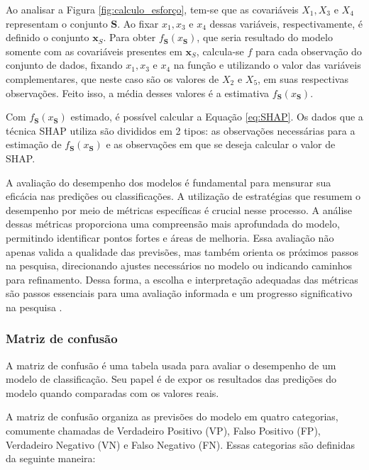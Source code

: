 Ao analisar a Figura \ref{fig:calculo_esforço}, tem-se que as covariáveis $X_1, X_3$ e $ X_4$ representam o conjunto $\textbf{S}$. 
Ao fixar $x_1, x_3$ e $ x_4$ dessas variáveis, respectivamente, é definido o conjunto $\textbf{x}_S$. 
Para obter $f_{\textbf{S}}(x_{\textbf{S}})$, que seria resultado do modelo somente com as covariáveis presentes 
em $\textbf{x}_S$, calcula-se $f$ para cada observação do conjunto de dados,
fixando $x_1, x_3$ e $ x_4$ na função e utilizando o valor das variáveis complementares, que neste caso são os
valores de $X_2$ e $X_5$, em suas respectivas observações. Feito isso, a média
desses valores é a estimativa
$f_{\textbf{S}}(x_{\textbf{S}})$.

Com $f_{\textbf{S}}(x_{\textbf{S}})$ estimado, é possível calcular a Equação \ref{eq:SHAP}. Os dados que a técnica SHAP 
utiliza são divididos em 2 tipos: as observações necessárias para a estimação de $f_{\textbf{S}}(x_{\textbf{S}})$
e as observações em que se deseja calcular o valor de SHAP. 



A avaliação do desempenho dos modelos é fundamental para mensurar sua eficácia nas predições ou classificações. 
A utilização de estratégias que resumem o desempenho por meio de métricas específicas é crucial nesse processo.
A análise dessas métricas proporciona uma compreensão mais aprofundada do modelo, permitindo identificar pontos 
fortes e áreas de melhoria. Essa avaliação não apenas valida a qualidade das previsões, mas também orienta os próximos
passos na pesquisa, direcionando ajustes necessários no modelo ou indicando caminhos para refinamento. 
Dessa forma, a escolha e interpretação adequadas das métricas são passos essenciais para uma avaliação informada 
e um progresso significativo na pesquisa \cite{geron2019hands}.

\subsubsection{Matriz de confusão}

A matriz de confusão é uma tabela usada para avaliar o desempenho de um modelo de classificação.
Seu papel é de expor os resultados das predições do modelo quando comparadas com os valores reais.

A matriz de confusão organiza as previsões do modelo em quatro categorias, comumente chamadas de Verdadeiro Positivo (VP), 
Falso Positivo (FP), Verdadeiro Negativo (VN) e Falso Negativo (FN). Essas categorias são definidas da seguinte maneira:

